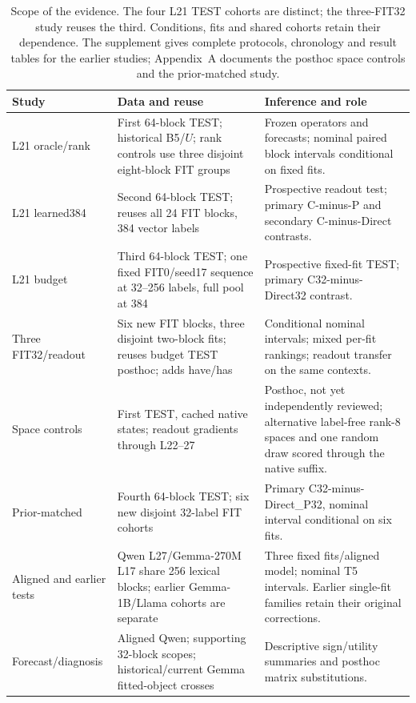 \documentclass[11pt]{article}
\begin{document}
\begin{table}[ht]\centering\scriptsize
\setlength{\tabcolsep}{4pt}
\begin{tabular}{>{\raggedright\arraybackslash}p{}>{\raggedright\arraybackslash}p{}>{\raggedright\arraybackslash}p{}}\toprule
Study & Data and reuse & Inference and role\\\midrule
L21 oracle/rank & First 64-block TEST; historical B5/$U$; rank controls use three disjoint eight-block FIT groups & Frozen operators and forecasts; nominal paired block intervals conditional on fixed fits.\\[3pt]
L21 learned384 & Second 64-block TEST; reuses all 24 FIT blocks, 384 vector labels & Prospective readout test; primary C-minus-P and secondary C-minus-Direct contrasts.\\[3pt]
L21 budget & Third 64-block TEST; one fixed FIT0/seed17 sequence at 32--256 labels, full pool at 384 & Prospective fixed-fit TEST; primary C32-minus-Direct32 contrast.\\[3pt]
Three FIT32/readout & Six new FIT blocks, three disjoint two-block fits; reuses budget TEST posthoc; adds have/has & Conditional nominal intervals; mixed per-fit rankings; readout transfer on the same contexts.\\[3pt]
Space controls & First TEST, cached native states; readout gradients through L22--27 & Posthoc, not yet independently reviewed; alternative label-free rank-8 spaces and one random draw scored through the native suffix.\\[3pt]
Prior-matched & Fourth 64-block TEST; six new disjoint 32-label FIT cohorts & Primary C32-minus-Direct\_P32, nominal interval conditional on six fits.\\[3pt]
Aligned and earlier tests & Qwen L27/Gemma-270M L17 share 256 lexical blocks; earlier Gemma-1B/Llama cohorts are separate & Three fixed fits/aligned model; nominal T5 intervals. Earlier single-fit families retain their original corrections.\\[3pt]
Forecast/diagnosis & Aligned Qwen; supporting 32-block scopes; historical/current Gemma fitted-object crosses & Descriptive sign/utility summaries and posthoc matrix substitutions.\\\bottomrule
\end{tabular}
\caption{Scope of the evidence. The four L21 TEST cohorts are distinct; the three-FIT32 study reuses the third. Conditions, fits and shared cohorts retain their dependence. The supplement gives complete protocols, chronology and result tables for the earlier studies; Appendix~A documents the posthoc space controls and the prior-matched study.}\label{tab:scope}
\end{table}
\end{document}
